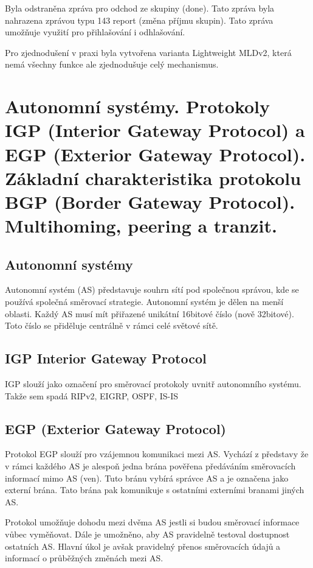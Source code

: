 Byla odstraněna zpráva pro odchod ze skupiny (done).
Tato zpráva byla nahrazena zprávou typu 143 report (změna příjmu skupin).
Tato zpráva umožňuje využití pro přihlašování i odhlašování.

Pro zjednodušení v praxi byla vytvořena varianta Lightweight MLDv2, která nemá všechny funkce ale zjednodušuje celý mechanismus.


\clearpage
\section{Autonomní systémy. Protokoly IGP (Interior Gateway Protocol) a EGP (Exterior Gateway Protocol). Základní charakteristika protokolu BGP (Border Gateway Protocol). Multihoming, peering a tranzit.}

\subsection{Autonomní systémy}

Autonomní systém (AS) představuje souhrn sítí pod společnou správou, kde se používá společná směrovací strategie.
Autonomní systém je dělen na menší oblasti.
Každý AS musí mít přiřazené unikátní 16bitové číslo (nově 32bitové).
Toto číslo se přiděluje centrálně v rámci celé světové sítě.

\subsection{IGP Interior Gateway Protocol}

IGP slouží jako označení pro směrovací protokoly uvnitř autonomního systému.
Takže sem spadá RIPv2, EIGRP, OSPF, IS-IS

\subsection{EGP (Exterior Gateway Protocol)}

Protokol EGP slouží pro vzájemnou komunikaci mezi AS.
Vychází z představy že v rámci každého AS je alespoň jedna brána pověřena předáváním směrovacích informací mimo AS (ven).
Tuto bránu vybírá správce AS a je označena jako externí brána.
Tato brána pak komunikuje s ostatními externími branami jiných AS.

Protokol umožňuje dohodu mezi dvěma AS jestli si budou směrovací informace vůbec vyměňovat.
Dále je umožněno, aby AS pravidelně testoval dostupnost ostatních AS.
Hlavní úkol je avšak pravidelný přenos směrovacích údajů a informací o průběžných změnách mezi AS.

